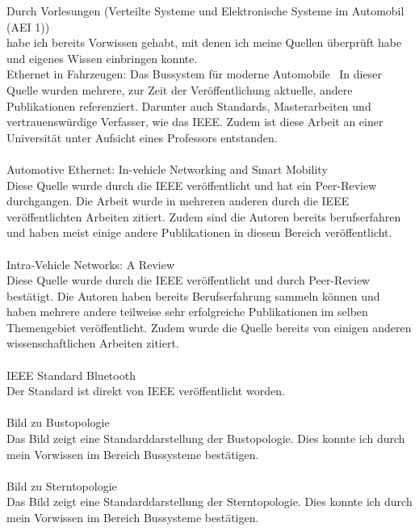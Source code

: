 Durch Vorlesungen (Verteilte Systeme und Elektronische Systeme im Automobil (AEI 1)) \\
habe ich bereits Vorwissen gehabt, mit denen ich meine Quellen überprüft habe 
und eigenes Wissen einbringen konnte.
\\

Ethernet in Fahrzeugen: Das Bussystem für moderne Automobile \cite{.MH_Ethernet}\
In dieser Quelle wurden mehrere, zur Zeit der Veröffentlichung aktuelle, andere
Publikationen referenziert. Darunter auch Standards, Masterarbeiten und vertrauenswürdige
Verfasser, wie das IEEE.
Zudem ist diese Arbeit an einer Universität unter Aufsicht eines Professors entstanden.\\\\

Automotive Ethernet: In-vehicle Networking and Smart Mobility \cite{.MH_Vehicle}\\
Diese Quelle wurde durch die IEEE veröffentlicht und hat ein Peer-Review durchgangen.
Die Arbeit wurde in mehreren anderen durch die IEEE veröffentlichten Arbeiten zitiert.
Zudem sind die Autoren bereits berufserfahren und haben meist einige andere Publikationen
in diesem Bereich veröffentlicht.\\\\

Intra-Vehicle Networks: A Review \cite{.MH_Review}\\
Diese Quelle wurde durch die IEEE veröffentlicht und durch Peer-Review bestätigt. 
Die Autoren haben bereits Berufserfahrung sammeln können und haben mehrere andere 
teilweise sehr erfolgreiche Publikationen im selben Themengebiet veröffentlicht. 
Zudem wurde die Quelle bereits von einigen anderen wissenschaftlichen Arbeiten zitiert.\\\\

IEEE Standard Bluetooth \cite{.MH_Blue2}\\
Der Standard ist direkt von IEEE veröffentlicht worden.\\\\

Bild zu Bustopologie \cite{.MH_Bus}\\
Das Bild zeigt eine Standarddarstellung der Bustopologie. Dies konnte ich 
durch mein Vorwissen im Bereich Bussysteme bestätigen.\\\\

Bild zu Sterntopologie \cite{.MH_Star}\\
Das Bild zeigt eine Standarddarstellung der Sterntopologie. Dies konnte ich 
durch mein Vorwissen im Bereich Bussysteme bestätigen.\\\\

